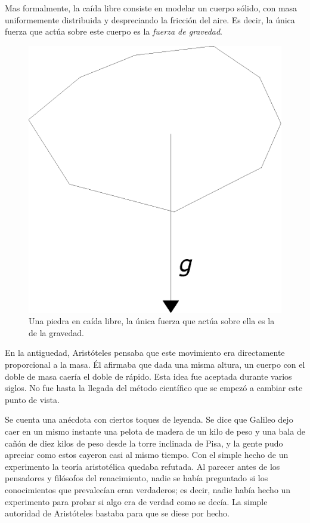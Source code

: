 Mas formalmente, la caída libre consiste en modelar un cuerpo sólido, con masa uniformemente distribuida y despreciando la fricción del aire.
Es decir, la única fuerza que actúa sobre este cuerpo es la \emph{fuerza de gravedad}.

\begin{figure}
 \centering
 \includegraphics[]{Img/caida_libre}
 \caption[Ejemplo de caída libre]{ 
 Una piedra en caída libre, la única fuerza que actúa sobre ella es la de la gravedad.
 } \label{piedra:fig}
\end{figure}

En la antiguedad, Aristóteles pensaba que este movimiento era directamente proporcional a la masa.
Él afirmaba que dada una misma altura, un cuerpo con el doble de masa caería el doble de rápido.
Esta idea fue aceptada durante varios siglos.
No fue hasta la llegada del método científico que se empezó a cambiar este punto de vista.

Se cuenta una anécdota con ciertos toques de leyenda.
Se dice que Galileo dejo caer en un mismo instante una pelota de madera de un kilo de peso y una bala de cañón de diez kilos de peso desde la torre inclinada de Pisa, y la gente pudo apreciar como estos cayeron casi al mismo tiempo.
Con el simple hecho de un experimento la teoría aristotélica quedaba refutada.
Al parecer antes de los pensadores y filósofos del renacimiento, nadie se había preguntado si los conocimientos que prevalecían eran verdaderos; es decir, nadie había hecho un experimento para probar si algo era de verdad como se decía.
La simple autoridad de Aristóteles bastaba para que se diese por hecho.


